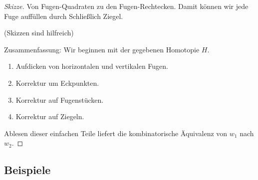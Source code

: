 \begin{st}
\begin{proof}[Skizze]
        Von Fugen-Quadraten zu den Fugen-Rechtecken.
        Damit können wir jede Fuge auffüllen durch
        Schließlich Ziegel.

        (Skizzen sind hilfreich)

        Zusammenfassung:
        Wir beginnen mit der gegebenen Homotopie $H$.
        \begin{enumerate}[1.]
            \item
                Aufdicken von horizontalen und vertikalen Fugen.
            \item
                Korrektur um Eckpunkten.
            \item
                Korrektur auf Fugenstücken.
            \item
                Korrektur auf Ziegeln.
        \end{enumerate}
        Ablesen dieser einfachen Teile liefert die kombinatorische Äquivalenz von $w_1$ nach $w_2$.
    \end{proof}
\end{st}


\subsection{Beispiele}


